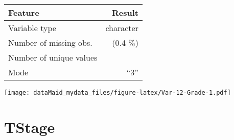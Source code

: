 \documentclass[]{report}
\begin{document}
\begin{minipage}{0.75 \textwidth}

\begin{longtable}[]{@{}lr@{}}
\toprule
\begin{minipage}[b]{0.34\columnwidth}\raggedright
Feature\strut
\end{minipage} & \begin{minipage}[b]{0.16\columnwidth}\raggedleft
Result\strut
\end{minipage}\tabularnewline
\midrule
\endhead
\begin{minipage}[t]{0.34\columnwidth}\raggedright
Variable type\strut
\end{minipage} & \begin{minipage}[t]{0.16\columnwidth}\raggedleft
character\strut
\end{minipage}\tabularnewline
\begin{minipage}[t]{0.34\columnwidth}\raggedright
Number of missing obs.\strut
\end{minipage} & \begin{minipage}[t]{0.16\columnwidth}\raggedleft
1 (0.4 \%)\strut
\end{minipage}\tabularnewline
\begin{minipage}[t]{0.34\columnwidth}\raggedright
Number of unique values\strut
\end{minipage} & \begin{minipage}[t]{0.16\columnwidth}\raggedleft
3\strut
\end{minipage}\tabularnewline
\begin{minipage}[t]{0.34\columnwidth}\raggedright
Mode\strut
\end{minipage} & \begin{minipage}[t]{0.16\columnwidth}\raggedleft
``3''\strut
\end{minipage}\tabularnewline
\bottomrule
\end{longtable}

\end{minipage}
\begin{minipage}{0.25 \textwidth}

\texttt{[image: dataMaid\_mydata\_files/figure-latex/Var-12-Grade-1.pdf]}

\end{minipage}

\noindent\makebox[\linewidth]{\rule{\textwidth}{0.4pt}}

\hypertarget{tstage}{%
\section{TStage}\label{tstage}}
\end{document}
